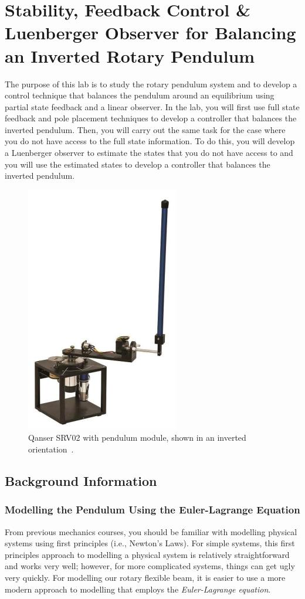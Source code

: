\chapter{Stability, Feedback Control \& Luenberger Observer for Balancing an Inverted Rotary Pendulum}

The purpose of this lab is to study the rotary pendulum system and to develop a control technique that balances the pendulum around an equilibrium using partial state feedback and a linear observer. In the lab, you will first use full state feedback and pole placement techniques to develop a controller that balances the inverted pendulum. Then, you will carry out the same task for the case where you do not have access to the full state information. To do this, you will develop a Luenberger observer to estimate the states that you do not have access to and you will use the estimated states to develop a controller that balances the inverted pendulum.
\begin{figure}[htb!]
    \centering
    \includegraphics[width=.3\linewidth]{eps/lab_3/quanser.eps}
    \caption{Qanser SRV02 with pendulum module, shown in an inverted orientation~\cite{Q-Flex-Beam}.}
    \label{fig:lab3_plant}
\end{figure}

\section{Background Information}
\subsection{Modelling the Pendulum Using the Euler-Lagrange Equation}
From previous mechanics courses, you should be familiar with modelling physical systems using first principles (i.e., Newton's Laws). For simple systems, this first principles approach to modelling a physical system is relatively straightforward and works very well; however, for more complicated systems, things can get ugly very quickly. For modelling our rotary flexible beam, it is easier to use a more modern approach to modelling that employs the \emph{Euler-Lagrange equation}.

